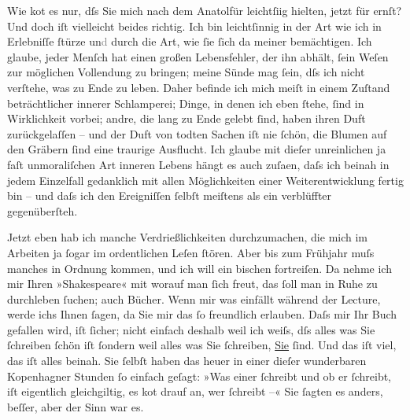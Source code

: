 \pstart
           Wie ko{\geminationm}t es nur, dſs Sie mich nach dem Anatolfür leichtſi{\geminationn}ig
               hielten, jetzt für ernſt? Und doch iſt vielleicht beides richtig. Ich bin
               leichtſinnig in der Art wie ich in Erlebniſſe ſtürze un\textcolor{gray}{d}{ }\label{T_L00643-1v}\label{T_L00643-1} durch
               die Art, wie ſie ſich da{\geminationn} meiner bemächtigen. Ich
               glaube, jeder Menſch hat einen großen Lebensfehler, der ihn abhält, ſein Weſen zur
               möglichen Vollendung zu bringen; meine Sünde mag ſein, dſs ich nicht verſtehe, was zu
               Ende zu leben. Daher befinde ich mich meiſt in einem Zuſtand beträchtlicher innerer
               Schlamperei; Dinge, in denen ich eben ſtehe, ſind in Wirklichkeit {\pb}vorbei; andre, die lang zu Ende gelebt ſind, haben
               ihren Duft zurückgelaſſen – und der Duft von todten Sachen iſt nie ſchön, die Blumen
               auf den Gräbern ſind eine traurige Ausflucht. Ich glaube mit dieſer unreinlichen ja
               faſt unmoraliſchen Art inneren Lebens hängt es auch zuſa\textcolor{gray}{{\geminationm}}en, daſs ich beinah in jedem Einzelfall gedanklich mit allen Möglichkeiten
               einer Weiterentwicklung fertig bin – und daſs ich den Ereigniſſen ſelbſt meiſtens als
               ein verblüffter gegenüberſteh.\pend
           
\pstart
           {\pb}Jetzt eben hab ich manche Verdrießlichkeiten
               durchzumachen, die mich im Arbeiten ja ſogar im ordentlichen Leſen ſtören. Aber bis
               zum Frühjahr muſs manches in Ordnung kommen, und ich will ein bischen fortreiſen. Da
               nehme ich mir Ihren »Shakespeare« mit worauf man
               ſich freut, das ſoll man in Ruhe zu durchleben ſuchen; auch Bücher. Wenn mir was
               einfällt während der Lecture, werde ichs Ihnen ſagen, da Sie mir das ſo freundlich
               erlauben. Daſs {\pb}mir Ihr Buch gefallen wird, iſt
               ſicher; nicht einfach deshalb weil ich weiſs, dſs alles was Sie ſchreiben ſchön iſt
               ſondern weil alles was Sie ſchreiben, \uline{Sie}{ }ſind. Und das iſt viel, das iſt alles beinah. Sie
               ſelbſt haben das heuer in einer dieſer wunderbaren Kopenhagner Stunden ſo einfach geſagt: »Was einer ſchreibt und ob er
               ſchreibt, iſt eigentlich gleichgiltig, es ko{\geminationm}t drauf an,
               wer ſchreibt –« Sie ſagten es anders, beſſer, aber der Sinn {\pb}war es.\pend
           
